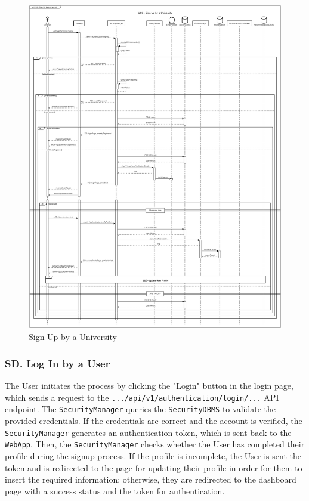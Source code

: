 \begin{figure}[H]
    \begin{center}
         \includegraphics[width=0.9\linewidth]{LaTeXCode/images/SequenceDiagrams/UC3-sequenceDiagram.png}
         \caption{Sign Up by a University}
         \label{fig:signup_university_sd}
     \end{center}
\end{figure}

\subsubsection*{SD\cuc. Log In by a User}
\label{subsubsec:login_user_sd}
The User initiates the process by clicking the "Login" button in the login page, which sends a request to the \texttt{.../api/v1/authentication/login/...} API endpoint. The \texttt{SecurityManager} queries the \texttt{SecurityDBMS} to validate the provided credentials.
If the credentials are correct and the account is verified, the \texttt{SecurityManager} generates an authentication token, which is sent back to the \texttt{WebApp}. Then, the \texttt{SecurityManager} checks whether the User has completed their profile during the signup process. If the profile is incomplete, the User is sent the token and is redirected to the page for updating their profile in order for them to insert the required information; otherwise, they are redirected to the dashboard page with a success status and the token for authentication.

